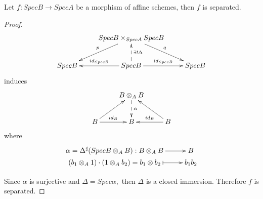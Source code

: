 \begin{prop}
Let $f: SpecB\rightarrow SpecA$ be a morphism of affine schemes,
then $f$ is separated.
\end{prop}
\begin{proof}
\[ \xymatrix{
   & {SpecB\times_{SpecA} SpecB} \ar[dl]_p \ar[dr]^q      \\
   SpecB & SpecB \ar[l]_-{id_{SpecB}} \ar[r]^-{id_{SpecB}}
   \ar@{-->}[u]_-{\exists !\Delta} & SpecB }  \]
induces
\[ \xymatrix{
   & {B\otimes_A B} \ar@{-->}[d]^{\alpha}                       \\
   B \ar[ur] \ar[r]^-{id_B} & B & B \ar[l]_-{id_B} \ar[ul] }  \]
where
\[ \xymatrix@R=0em{
   {\alpha=\Delta^{\sharp}(SpecB\otimes_A B):B\otimes_A B} \ar[r] &
   B                                                 \\
   {(b_1\otimes_A 1)\cdot(1\otimes_A b_2)=b_1\otimes b_2}
   \ar@{|->}[r] & b_1b_2 }  \]

Since $\alpha$ is surjective and $\Delta=Spec\alpha,$ then $\Delta$
is a closed immersion. Therefore $f$ is separated.
\end{proof}
